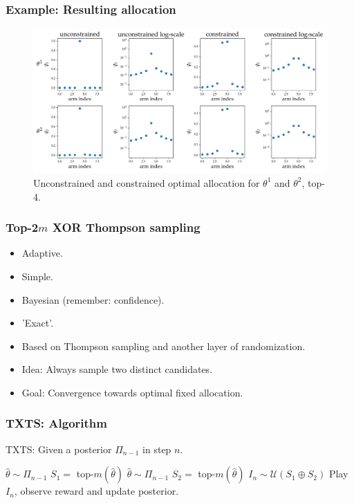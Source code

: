 \documentclass[aspectratio=43]{beamer}
\begin{document}
\begin{frame}
\frametitle{Example: Resulting allocation}
\begin{figure}[h]
  \centering
  \includegraphics[width=\textwidth]{optimal_allocation.png}
  \caption{Unconstrained and constrained optimal allocation for $\theta^1$ and $\theta^2$, top-4.}
  \label{fig:optimal_allocation}
\end{figure}
\end{frame}

\begin{frame}
\frametitle{Top-2$m$ XOR Thompson sampling}
\begin{itemize}
  \item Adaptive.
  \item Simple.
  \item Bayesian (remember: confidence).
  \item 'Exact'.
  \item Based on Thompson sampling and another layer of randomization.
  \item Idea: Always sample two distinct candidates.
  \item Goal: Convergence towards optimal fixed allocation.
\end{itemize}
\end{frame}

\begin{frame}
\frametitle{TXTS: Algorithm}
\begin{algorithm}[H]
  \caption{TXTS: Given a posterior $\Pi_{n-1}$ in step $n$.}
  \label{alg:TXTS}
  \begin{algorithmic}
    \State $\hat{\theta} \sim \Pi_{n-1}$
    \State $S_1 =$ top-$m(\hat{\theta})$
    \Repeat
      \State $\hat{\theta} \sim \Pi_{n-1}$
      \State $S_2 = $ top-$m(\hat{\theta})$
    \State $I_n \sim \mathcal{U}(S_1 \oplus S_2)$
    \State Play $I_n$, observe reward and update posterior.
  \end{algorithmic}
\end{algorithm}
\end{frame}
\end{document}
